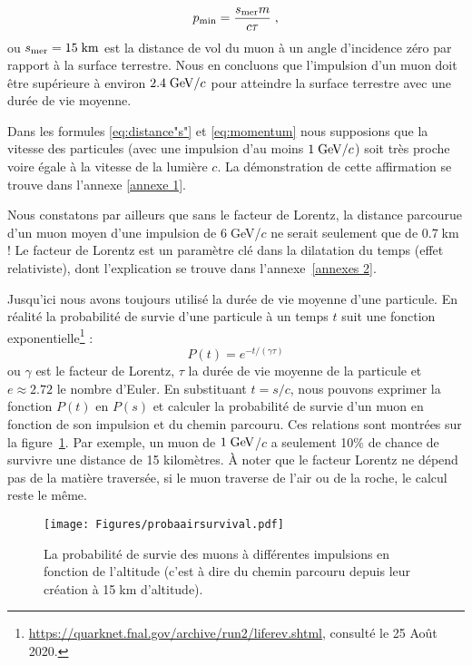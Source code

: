 \documentclass[a4paper, 12pt]{article}
\begin{document}
\begin{spacing}{1.5}
\begin{equation}
\label{eq:momentum}
p_{\rm min} = \frac{s_{\rm mer}m}{c\tau}\;,
\end{equation}
ou $s_{\rm mer}=15\;{\rm km}$ est la distance de vol du muon à un angle d'incidence zéro par rapport à la surface terrestre. Nous en concluons que l'impulsion d'un muon doit être supérieure à environ $2.4\;{\rm GeV}/c$ pour atteindre la surface terrestre avec une durée de vie moyenne. 

Dans les formules \ref{eq:distance"s"} et \ref{eq:momentum} nous supposions que la vitesse des particules (avec une impulsion d'au moins $1\;{\rm GeV}/c$) soit très proche voire égale à la vitesse de la lumière $c$. La démonstration de cette affirmation se trouve dans l'annexe \ref{annexe 1}. 

Nous constatons par ailleurs que sans le facteur de Lorentz, la distance parcourue d'un muon moyen d'une impulsion de $6$$\;$GeV/$c$ ne serait seulement que de 0.7$\;$km ! Le facteur de Lorentz est un paramètre clé dans la dilatation du temps (effet relativiste), dont l'explication se trouve dans l'annexe~\ref{annexes 2}.

Jusqu'ici nous avons toujours utilisé la durée de vie moyenne d'une particule. En réalité la probabilité de survie d'une particule à un temps $t$ suit une fonction exponentielle\footnote{\url{https://quarknet.fnal.gov/archive/run2/liferev.shtml}, consulté le 25 Août 2020.} : 
\begin{equation}
P(t)=e^{-t/(\gamma\tau)}
\label{eq:decay}
\end{equation}
ou $\gamma$ est le facteur de Lorentz, $\tau$ la durée de vie moyenne de la particule et $e\approx2.72$ le nombre d'Euler. En substituant $t = s/c$, nous pouvons exprimer la fonction $P(t)$ en $P(s)$ et calculer la probabilité de survie d'un muon en fonction de son impulsion et du chemin parcouru. Ces relations sont montrées sur la figure~\ref{fig:probaairsurvival}. Par exemple, un muon de $1\;{\rm GeV}$/$c$ a seulement 10\% de chance de survivre une distance de 15 kilomètres. À noter que le facteur Lorentz ne dépend pas de la matière traversée, si le muon traverse de l'air ou de la roche, le calcul reste le même.
\begin{figure}
\begin{center}
\texttt{[image: Figures/probaairsurvival.pdf]}
\caption{\label{fig:probaairsurvival} La probabilité de survie des muons à différentes impulsions en fonction de l'altitude (c'est à dire du chemin parcouru depuis leur création à 15$\;$km d'altitude).}
\end{center}
\end{figure}



\end{spacing}
\end{document}
